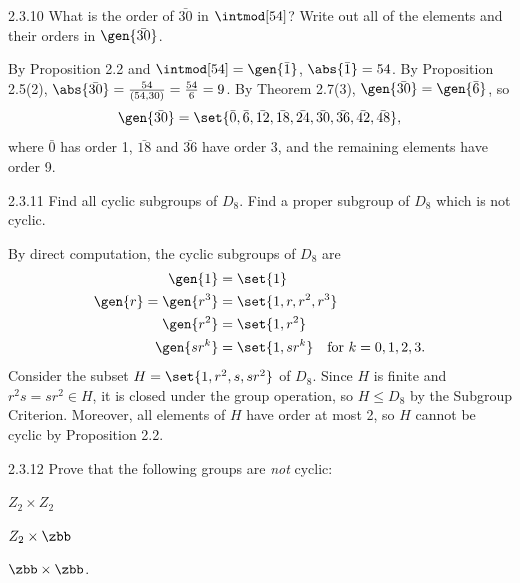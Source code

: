 \begin{exercise}{2.3.10}
    What is the order of $\bar{30}$ in $\intmod[54]$?
	Write out all of the elements and their orders in $\gen{\bar{30}}$.
\end{exercise}

\begin{sol}
    By Proposition 2.2 and $\intmod[54] = \gen{\bar 1}$, $\abs{\bar 1} = 54$.
    By Proposition 2.5(2), $\abs{\bar{30}} = \frac{54}{(54, 30)} = \frac{54}{6} = 9$.
    By Theorem 2.7(3), $\gen{\bar{30}} = \gen{\bar 6}$, so
    \[
        \gen{\bar{30}} = \set{\bar 0, \bar 6, \bar{12}, \bar{18}, \bar{24}, \bar{30}, \bar{36}, \bar{42}, \bar{48}},
    \]
    where $\bar 0$ has order 1, $\bar{18}$ and $\bar{36}$ have order 3, and the remaining elements have order 9.
\end{sol}

\begin{exercise}{2.3.11}
    Find all cyclic subgroups of $D_8$.
	Find a proper subgroup of $D_8$ which is not cyclic.
\end{exercise}

\begin{sol}
    By direct computation, the cyclic subgroups of $D_8$ are
    \begin{align*}
        \gen{1} &= \set{1} \\
        \gen{r} = \gen{r^3} &= \set{1, r, r^2, r^3} \\
        \gen{r^2} &= \set{1, r^2} \\
        \gen{sr^k} &= \set{1, sr^k} \quad \text{for } k = 0, 1, 2, 3.
    \end{align*}
    Consider the subset $H = \set{1, r^2, s, sr^2}$ of $D_8$.
    Since $H$ is finite and $r^2s = sr^2 \in H$, it is closed under the group operation, so $H \leq D_8$ by the Subgroup Criterion.
    Moreover, all elements of $H$ have order at most 2, so $H$ cannot be cyclic by Proposition 2.2.
\end{sol}

\begin{exercise}{2.3.12}
    Prove that the following groups are \emph{not} cyclic:
    \begin{subexercises}
        \item $Z_2 \times Z_2$
        \item $Z_2 \times \zbb$
        \item $\zbb \times \zbb$.
    \end{subexercises}
\end{exercise}

